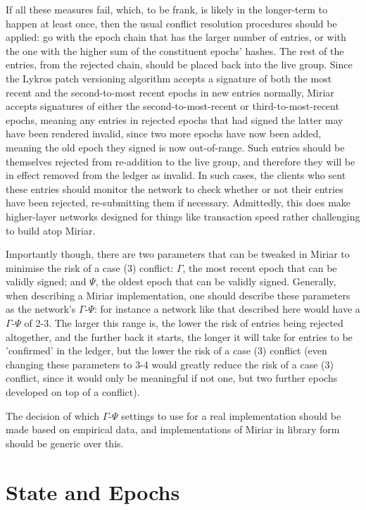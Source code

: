 \documentclass{extreport}
\begin{document}
If all these measures fail, which, to be frank, is likely in the longer-term to happen at least once, then the usual conflict resolution procedures should be applied: go with the epoch chain that has the larger number of entries, or with the one with the higher sum of the constituent epochs' hashes. The rest of the entries, from the rejected chain, should be placed back into the live group. Since the Lykros patch versioning algorithm accepts a signature of both the most recent and the second-to-most recent epochs in new entries normally, Miriar accepts signatures of either the second-to-most-recent or third-to-most-recent epochs, meaning any entries in rejected epochs that had signed the latter may have been rendered invalid, since two more epochs have now been added, meaning the old epoch they signed is now out-of-range. Such entries should be themselves rejected from re-addition to the live group, and therefore they will be in effect removed from the ledger as invalid. In such cases, the clients who sent these entries should monitor the network to check whether or not their entries have been rejected, re-submitting them if necessary. Admittedly, this does make higher-layer networks designed for things like transaction speed rather challenging to build atop Miriar.

Importantly though, there are two parameters that can be tweaked in Miriar to minimise the risk of a case (3) conflict: \(\Gamma\), the most recent epoch that can be validly signed; and \(\Psi\), the oldest epoch that can be validly signed. Generally, when describing a Miriar implementation, one should describe these parameters as the network's \(\Gamma\)-\(\Psi\): for instance a network like that described here would have a \(\Gamma\)-\(\Psi\) of 2-3. The larger this range is, the lower the risk of entries being rejected altogether, and the further back it starts, the longer it will take for entries to be 'confirmed' in the ledger, but the lower the risk of a case (3) conflict (even changing these parameters to 3-4 would greatly reduce the risk of a case (3) conflict, since it would only be meaningful if not one, but two further epochs developed on top of a conflict).

The decision of which \(\Gamma\)-\(\Psi\) settings to use for a real implementation should be made based on empirical data, and implementations of Miriar in library form should be generic over this.

\section{State and Epochs}
\end{document}
